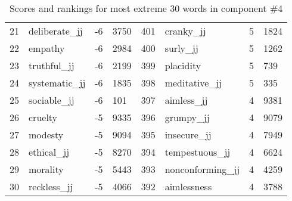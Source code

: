 \begin{table}[tbp]
\begin{tabular}{| rlr@{.}l | rlr@{.}l |}
    21 & deliberate\_jj & -6 & 3750    &    401 & cranky\_jj & 5 & 1824 \\
    22 & empathy & -6 & 2984    &    400 & surly\_jj & 5 & 1262 \\
    23 & truthful\_jj & -6 & 2199    &    399 & placidity & 5 & 739 \\
    24 & systematic\_jj & -6 & 1835    &    398 & meditative\_jj & 5 & 335 \\
    25 & sociable\_jj & -6 & 101    &    397 & aimless\_jj & 4 & 9381 \\
    26 & cruelty & -5 & 9335    &    396 & grumpy\_jj & 4 & 9079 \\
    27 & modesty & -5 & 9094    &    395 & insecure\_jj & 4 & 7949 \\
    28 & ethical\_jj & -5 & 8270    &    394 & tempestuous\_jj & 4 & 6624 \\
    29 & morality & -5 & 5443    &    393 & nonconforming\_jj & 4 & 4259 \\
    30 & reckless\_jj & -5 & 4066    &    392 & aimlessness & 4 & 3788 \\
    \hline
    \end{tabular}
    \caption{Scores and rankings for most extreme 30 words in component \#4} 
\end{table}
\clearpage
